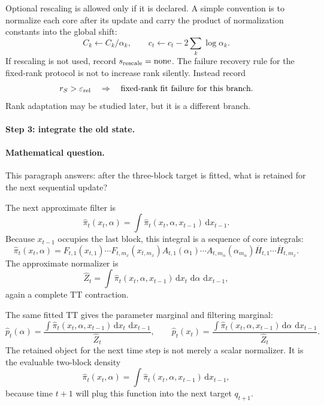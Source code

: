 \documentclass[11pt]{article}
\newcommand{\dd}{\,\mathrm d}
\begin{document}
Optional rescaling is allowed only if it is declared.  A simple convention is
to normalize each core after its update and carry the product of normalization
constants into the global shift:
\[
    C_k\leftarrow C_k/\alpha_k,
    \qquad
    c_t\leftarrow c_t-2\sum_k\log \alpha_k.
    \label{eq:p24-p23-sweep7}
\]
If rescaling is not used, record \(s_{\rm rescale}=\text{none}\).  The failure
recovery rule for the fixed-rank protocol is not to increase rank silently.
Instead record
\[
    r_S>\varepsilon_{\rm rel}
    \quad\Rightarrow\quad
    \text{fixed-rank fit failure for this branch}.
    \label{eq:p24-p23-sweep8}
\]
Rank adaptation may be studied later, but it is a different branch.

\paragraph{Step 3: integrate the old state.}
\paragraph{Mathematical question.}
This paragraph answers: after the three-block target is fitted, what is
retained for the next sequential update?

The next approximate filter is
\[
    \widehat\pi_t(x_t,\alpha)
    =
    \int \widehat\pi_t(x_t,\alpha,x_{t-1})\dd x_{t-1}.
    \label{eq:p24-a1-3}
\]
Because \(x_{t-1}\) occupies the last block, this integral is a sequence of core
integrals:
\[
    \widehat\pi_t(x_t,\alpha)
    =
    F_{t,1}(x_{t,1})\cdots F_{t,m_x}(x_{t,m_x})
    A_{t,1}(\alpha_1)\cdots A_{t,m_\alpha}(\alpha_{m_\alpha})
    \overline H_{t,1}\cdots \overline H_{t,m_x}.
    \label{eq:p24-a1-4}
\]
The approximate normalizer is
\[
    \widehat Z_t
    =
    \int \widehat\pi_t(x_t,\alpha,x_{t-1})
    \dd x_t\,\dd\alpha\,\dd x_{t-1},
    \label{eq:p24-a1-5}
\]
again a complete TT contraction.

The same fitted TT gives the parameter marginal and filtering marginal:
\[
    \widehat p_t(\alpha)
    =
    \frac{\int\widehat\pi_t(x_t,\alpha,x_{t-1})
    \dd x_t\,\dd x_{t-1}}
    {\widehat Z_t},
    \qquad
    \widehat p_t(x_t)
    =
    \frac{\int\widehat\pi_t(x_t,\alpha,x_{t-1})
    \dd\alpha\,\dd x_{t-1}}
    {\widehat Z_t}.
    \label{eq:p24-a1-6}
\]
The retained object for the next time step is not merely a scalar
normalizer.  It is the evaluable two-block density
\[
    \widehat\pi_t(x_t,\alpha)
    =
    \int\widehat\pi_t(x_t,\alpha,x_{t-1})\dd x_{t-1},
    \label{eq:p24-a1-7}
\]
because time \(t+1\) will plug this function into the next target
\(q_{t+1}\).
\end{document}
